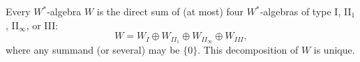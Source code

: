 Every $W^*$-algebra $W$ is the direct sum of (at most) four $W^*$-algebras of type I, II$_1$, II$_\infty$, or III:
$$W = W_I \oplus W_{II_1} \oplus W_{II_\infty} \oplus W_{III},$$
where any summand (or several) may be $\{0\}$. This decomposition of $W$ is unique.
